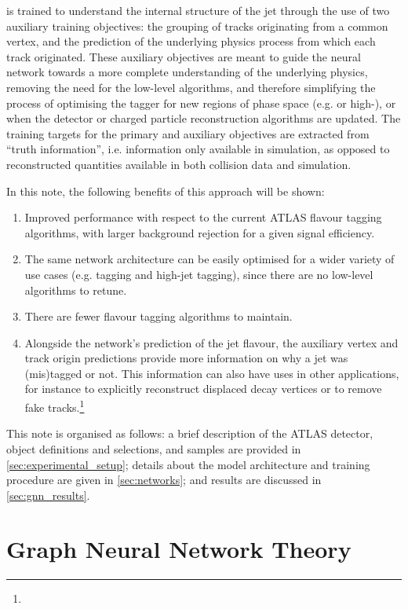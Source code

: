 \GNN is trained to understand the internal structure of the jet through the use of two auxiliary training objectives: the grouping of tracks originating from a common vertex, and the prediction of the underlying physics process from which each track originated.
These auxiliary objectives are meant to guide the neural network towards a more complete understanding of the underlying physics, removing the need for the low-level algorithms, and therefore simplifying the process of optimising the tagger for new regions of phase space (e.g. \ctag or high-\pt \btag), or when the detector or charged particle reconstruction algorithms are updated.
The training targets for the primary and auxiliary objectives are extracted from “truth information”, i.e. information only available in simulation, as opposed to reconstructed quantities available in both collision data and simulation.

In this note, the following benefits of this approach will be shown:

\begin{enumerate}
    \item Improved performance with respect to the current ATLAS flavour tagging algorithms, with larger background rejection for a given signal efficiency.
    \item The same network architecture can be easily optimised for a wider variety of use cases (e.g. \cjet tagging and high-\pt jet tagging), since there are no low-level algorithms to retune.
    \item There are fewer flavour tagging algorithms to maintain.
    \item Alongside the network's prediction of the jet flavour, the auxiliary vertex and track origin predictions provide more information on why a jet was (mis)tagged or not. This information can also have uses in other applications, for instance to explicitly reconstruct displaced decay vertices or to remove fake tracks.\footnote{\fakesfootnote}
\end{enumerate}

This note is organised as follows: a brief description of the ATLAS detector, object definitions and selections, and samples are provided in \cref{sec:experimental_setup}; details about the model architecture and training procedure are given in \cref{sec:networks}; and results are discussed in \cref{sec:gnn_results}.


\section{Graph Neural Network Theory}\label{sec:gnn_theory}



